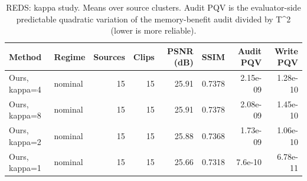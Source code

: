 \begin{table}[t]
\centering
\caption{REDS: kappa study. Means over source clusters. Audit PQV is the evaluator-side predictable quadratic variation of the memory-benefit audit divided by T^2 (lower is more reliable).}
\label{tab:kappa_REDS}
\small
\begin{tabular}{llrrrrrr}
\toprule
Method & Regime & Sources & Clips & PSNR (dB) & SSIM & Audit PQV & Write PQV \\
\midrule
Ours, kappa=4 & nominal & 15 & 15 & 25.91 & 0.7378 & 2.15e-09 & 1.28e-10 \\
Ours, kappa=8 & nominal & 15 & 15 & 25.91 & 0.7378 & 2.08e-09 & 1.45e-10 \\
Ours, kappa=2 & nominal & 15 & 15 & 25.88 & 0.7368 & 1.73e-09 & 1.06e-10 \\
Ours, kappa=1 & nominal & 15 & 15 & 25.66 & 0.7318 & 7.6e-10 & 6.78e-11 \\
\bottomrule
\end{tabular}
\end{table}
